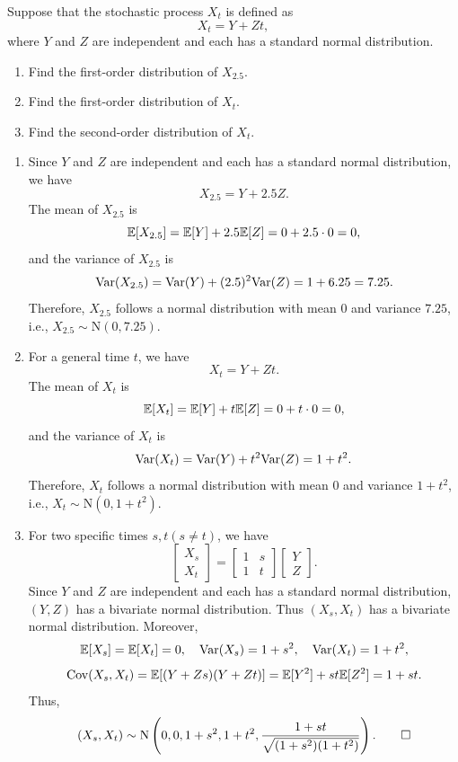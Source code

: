 \begin{example}
  Suppose that the stochastic process \(X_t\) is defined as
  \[
    X_t = Y + Zt,
  \]
  where \(Y\) and \(Z\) are independent and each has a standard normal distribution.
  \begin{enumerate}
    \item Find the first-order distribution of \(X_{2.5}\).
    \item Find the first-order distribution of \(X_t\).
    \item Find the second-order distribution of \(X_t\).
  \end{enumerate}
\end{example}
\begin{solution}
  \begin{enumerate}
    \item Since \(Y\) and \(Z\) are independent and each has a standard normal distribution, we have
    \[
      X_{2.5} = Y + 2.5Z.
    \]
    The mean of \(X_{2.5}\) is
    \[
      \mathbb{E}[X_{2.5}] = \mathbb{E}[Y] + 2.5\mathbb{E}[Z] = 0 + 2.5 \cdot 0 = 0,
    \]
    and the variance of \(X_{2.5}\) is
    \[
      \mathrm{Var}(X_{2.5}) = \mathrm{Var}(Y) + (2.5)^2 \mathrm{Var}(Z) = 1 + 6.25 = 7.25.
    \]
    Therefore, \(X_{2.5}\) follows a normal distribution with mean \(0\) and variance \(7.25\), i.e., \(X_{2.5} \sim \mathrm{N}(0, 7.25)\).

    \item For a general time \(t\), we have
    \[
      X_t = Y + Zt.
    \]
    The mean of \(X_t\) is
    \[
      \mathbb{E}[X_t] = \mathbb{E}[Y] + t\mathbb{E}[Z] = 0 + t \cdot 0 = 0,
    \]
    and the variance of \(X_t\) is
    \[
      \mathrm{Var}(X_t) = \mathrm{Var}(Y) + t^2 \mathrm{Var}(Z) = 1 + t^2.
    \]
    Therefore, \(X_t\) follows a normal distribution with mean \(0\) and variance \(1 + t^2\), i.e., \(X_t \sim \mathrm{N}(0, 1 + t^2)\).

    \item For two specific times \(s, t (s \neq t)\), we have
    \[
      \begin{bmatrix}
        X_s \\
        X_t
      \end{bmatrix}=
      \begin{bmatrix}
        1 & s \\
        1 & t
      \end{bmatrix}
      \begin{bmatrix}
        Y \\
        Z
      \end{bmatrix}.
    \]
    Since \(Y\) and \(Z\) are independent and each has a standard normal distribution, \((Y, Z)\) has a bivariate normal distribution. Thus \((X_s, X_t)\) has a bivariate normal distribution. Moreover,
    \[
      \mathbb{E}[X_s] = \mathbb{E}[X_t] = 0, \quad \mathrm{Var}(X_s) = 1 + s^2, \quad \mathrm{Var}(X_t) = 1 + t^2,
    \]
    \[
      \mathrm{Cov}(X_s, X_t) = \mathbb{E}[(Y + Zs)(Y + Zt)] = \mathbb{E}[Y^2] + st\mathbb{E}[Z^2] = 1 + st.
    \]
    Thus,
    \[
      (X_s, X_t) \sim \mathrm{N}\left(0, 0, 1 + s^2, 1 + t^2, \frac{1 + st}{\sqrt{(1 + s^2)(1 + t^2)}}\right). \qedhere
    \]
  \end{enumerate}
\end{solution}

